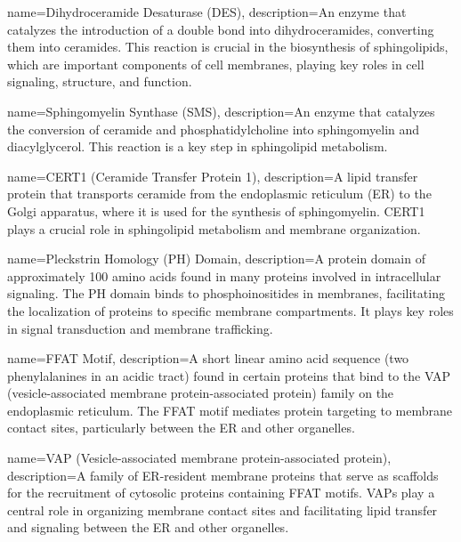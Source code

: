 
{
    name={Dihydroceramide Desaturase (DES)},
    description={An enzyme that catalyzes the introduction of a double bond into dihydroceramides, converting them into ceramides. This reaction is crucial in the biosynthesis of sphingolipids, which are important components of cell membranes, playing key roles in cell signaling, structure, and function.}
}

{
    name={Sphingomyelin Synthase (SMS)},
    description={An enzyme that catalyzes the conversion of ceramide and phosphatidylcholine into sphingomyelin and diacylglycerol. This reaction is a key step in sphingolipid metabolism.}
}

{
    name={CERT1 (Ceramide Transfer Protein 1)},
    description={A lipid transfer protein that transports ceramide from the endoplasmic reticulum (ER) to the Golgi apparatus, where it is used for the synthesis of sphingomyelin. CERT1 plays a crucial role in sphingolipid metabolism and membrane organization. }
}

{
    name={Pleckstrin Homology (PH) Domain},
    description={A protein domain of approximately 100 amino acids found in many proteins involved in intracellular signaling. The PH domain binds to phosphoinositides in membranes, facilitating the localization of proteins to specific membrane compartments. It plays key roles in signal transduction and membrane trafficking.}
}

{
    name={FFAT Motif},
    description={A short linear amino acid sequence (two phenylalanines in an acidic tract) found in certain proteins that bind to the VAP (vesicle-associated membrane protein-associated protein) family on the endoplasmic reticulum. The FFAT motif mediates protein targeting to membrane contact sites, particularly between the ER and other organelles.}
}

{
    name={VAP (Vesicle-associated membrane protein-associated protein)},
    description={A family of ER-resident membrane proteins that serve as scaffolds for the recruitment of cytosolic proteins containing FFAT motifs. VAPs play a central role in organizing membrane contact sites and facilitating lipid transfer and signaling between the ER and other organelles.}
}

